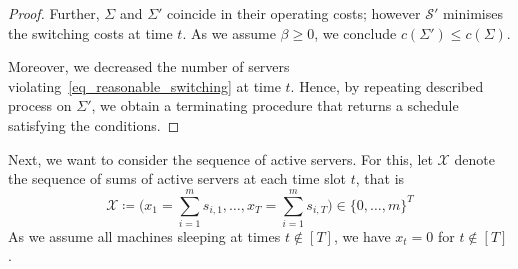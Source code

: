 \documentclass[hidelinks]{article}
\theoremstyle{plain}
\theoremstyle{definition}
\theoremstyle{rem}
\newcommand{\mx}{\mathcal{X}}
\newcommand{\costs}{c}
\newcommand{\fromto}[2]{\{#1,\ldots,#2\}}
\begin{document}
\begin{proof}
Further, $\Sigma$ and $\Sigma'$ coincide in their operating costs; however $\mathcal{S}'$ minimises the switching costs at time $t$. As we assume $\beta\ge0$, we conclude $\costs(\Sigma')\le \costs(\Sigma)$.

Moreover, we decreased the number of servers violating~\eqref{eq_reasonable_switching} at time $t$. Hence, by repeating described process on $\Sigma'$, we obtain a terminating procedure that returns a schedule satisfying the conditions.
\end{proof}

Next, we want to consider the sequence of active servers. For this, let $\mx$ denote the sequence of sums of active servers at each time slot $t$, that is
\begin{equation*}
	\mx\coloneqq\bigl(x_1=\sum\limits_{i=1}^{m}s_{i,1},\ldots,x_T=\sum\limits_{i=1}^{m}s_{i,T}\bigr)\in\fromto{0}{m}^T
\end{equation*}
As we assume all machines sleeping at times $t\notin[T]$, we have $x_t=0$ for $t\notin[T]$.
\end{document}
